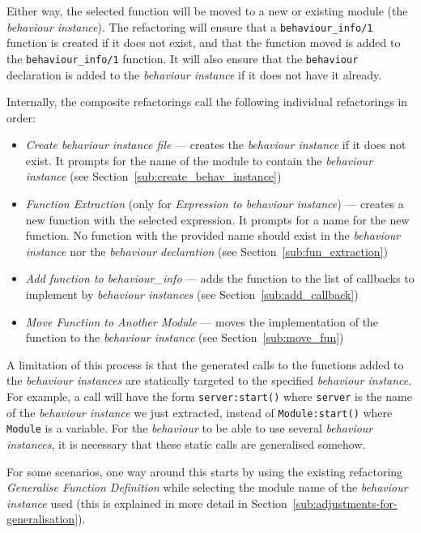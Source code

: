 Either way, the selected function will be moved to a new or existing
module (the \emph{behaviour instance}). The refactoring will ensure
that a \texttt{behaviour\_info/1} function is created if it does not
exist, and that the function moved is added to the \texttt{behaviour\_info/1}
function. It will also ensure that the \texttt{behaviour} declaration
is added to the \emph{behaviour instance} if it does not have it already. 

Internally, the composite refactorings call the following individual
refactorings in order:
\begin{itemize}
\item \emph{Create behaviour instance file} --- creates the \emph{behaviour
instance} if it does not exist. It prompts for the name of the module
to contain the \emph{behaviour instance} (see Section~\ref{sub:create_behav_instance})
\item \emph{Function Extraction} (only for \emph{Expression to behaviour
instance}) --- creates a new function with the selected expression.
It prompts for a name for the new function. No function with the provided
name should exist in the \emph{behaviour instance} nor the \emph{behaviour
declaration} (see Section~\ref{sub:fun_extraction})
\item \emph{Add function to behaviour\_info} --- adds the function to the
list of callbacks to implement by \emph{behaviour instances} (see
Section~\ref{sub:add_callback})
\item \emph{Move Function to Another Module} --- moves the implementation
of the function to the \emph{behaviour instance} (see Section~\ref{sub:move_fun})
\end{itemize}
A limitation of this process is that the generated calls to the functions
added to the \emph{behaviour instances} are statically targeted to
the specified \emph{behaviour instance}. For example, a call will have the
form \texttt{server:start()} where \texttt{server} is the name of
the \emph{behaviour instance} we just extracted, instead of \texttt{Module:start()}
where \texttt{Module} is a variable. For the \emph{behaviour} to
be able to use several \emph{behaviour instances}, it is necessary
that these static calls are generalised somehow.

For some scenarios, one way around this starts by using the existing
refactoring \emph{Generalise Function Definition} while selecting
the module name of the \emph{behaviour instance} used (this is explained
in more detail in Section~\ref{sub:adjustments-for-generalisation}).

